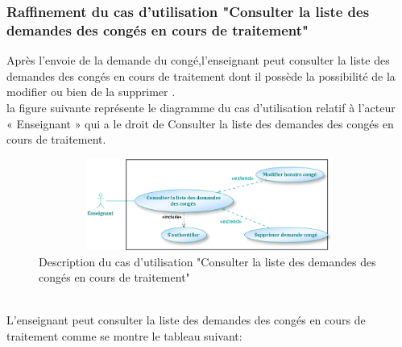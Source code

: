 \documentclass[12 pt]{report}
\begin{document}
\subsubsection{Raffinement du cas d’utilisation "Consulter la liste des demandes des congés en cours de traitement"}
Après l'envoie de la demande du congé,l'enseignant peut consulter la liste des demandes des congés en cours de traitement dont il possède la possibilité de la modifier ou bien de la supprimer  .\\
la figure suivante représente le diagramme du cas d’utilisation  relatif à l’acteur \\« Enseignant » qui a le droit de Consulter la liste des demandes des congés en cours de traitement.
\begin{figure}[h]
\begin{center}
\includegraphics[width= 12cm , height =3cm]{enseignant4.png}
\caption{Description du cas d'utilisation "Consulter la liste des demandes des congés en cours de traitement"}
\end{center}
\end{figure}
\\
L'enseignant peut consulter la liste des demandes des congés en cours de traitement comme se montre le tableau suivant:
\end{document}
